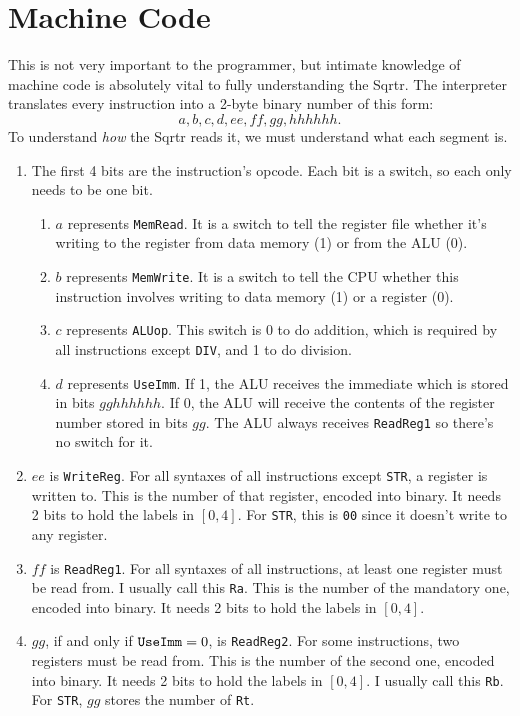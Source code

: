 \documentclass[12pt, oneside]{memoir}
\newcommand{\R}[1]{{\color{register}\texttt{R#1}}}
\newcommand{\instruction}[1]{{\color{instruction}\texttt{#1}}}
\begin{document}
\chapter{Machine Code}
This is not very important to the programmer, but intimate knowledge of machine code is absolutely vital to fully understanding the Sqrtr. The interpreter translates every instruction into a 2-byte binary number of this form:
\begin{equation*}
    a,b,c,d,ee,ff,gg,hhhhhh.
\end{equation*}
To understand \textit{how} the Sqrtr reads it, we must understand what each segment is.
\begin{enumerate}
    \item The first 4 bits are the instruction's opcode. Each bit is a switch, so each only needs to be one bit.
    \begin{enumerate}
        \item$a$ represents \texttt{MemRead}. It is a switch to tell the register file whether it's writing to the register from data memory (1) or from the ALU (0).
        \item $b$ represents \texttt{MemWrite}. It is a switch to tell the CPU whether this instruction involves writing to data memory (1) or a register (0).
        \item $c$ represents \texttt{ALUop}. This switch is 0 to do addition, which is required by all instructions except \instruction{DIV}, and 1 to do division.
        \item $d$ represents \texttt{UseImm}. If 1, the ALU receives the immediate which is stored in bits $gghhhhhh$. If 0, the ALU will receive the contents of the register number stored in bits $gg$. The ALU always receives \texttt{ReadReg1} so there's no switch for it.
    \end{enumerate}
    \item $ee$ is \texttt{WriteReg}. For all syntaxes of all instructions except \instruction{STR}, a register is written to. This is the number of that register, encoded into binary. It needs 2 bits to hold the labels in $[0,4]$. For \instruction{STR}, this is \texttt{00} since it doesn't write to any register.
    \item $ff$ is \texttt{ReadReg1}. For all syntaxes of all instructions, at least one register must be read from. I usually call this \R{a}. This is the number of the mandatory one, encoded into binary. It needs 2 bits to hold the labels in $[0,4]$.
    \item $gg$, if and only if $\text{\texttt{UseImm}} = 0$, is \texttt{ReadReg2}. For some instructions, two registers must be read from. This is the number of the second one, encoded into binary. It needs 2 bits to hold the labels in $[0,4]$. I usually call this \R{b}. For \instruction{STR}, $gg$ stores the number of \R{t}.

\end{enumerate}
\end{document}

